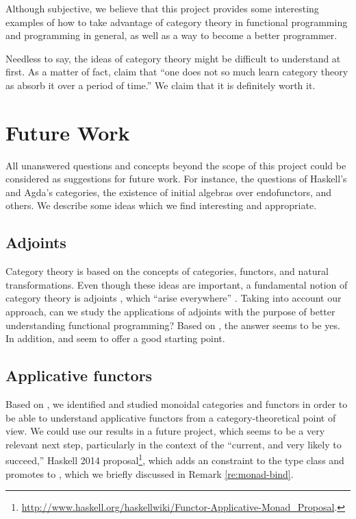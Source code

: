 Although subjective, we believe that this project provides some
interesting examples of how to take advantage of category theory in
functional programming and programming in general, as well as a way to
become a better programmer.

Needless to say, the ideas of category theory might be difficult to
understand at first. As a matter of fact,
\textcite[25]{bird-demoor-1997} claim that ``one does not so much
learn category theory as absorb it over a period of time.'' We claim
that it is definitely worth it.

\section{Future Work}
\label{sec:future}

All unanswered questions and concepts beyond the scope of this project
could be considered as suggestions for future work. For instance, the
questions of Haskell's and Agda's categories, the existence of initial
algebras over endofunctors, and others. We describe some ideas which
we find interesting and appropriate.

\subsection{Adjoints}
\label{sec:future-adjoints}

Category theory is based on the concepts of categories, functors, and
natural transformations. Even though these ideas are important, a
fundamental notion of category theory is adjoints
\parencite[11]{marquis-2013}, which ``arise everywhere''
\parencite[vii]{maclane-1998}. Taking into account our approach, can
we study the applications of adjoints with the purpose of better
understanding functional programming? Based on \parencites[§
  13]{barr-wells-2012}[79--81]{elkins-2009}[§~2.4]{pierce-1991}{rydeheard-1986-adjunctions}[§
  6]{rydeheard-burstall-1988}, the answer seems to be yes. In
addition, \textcite[§ 9]{awodey-2010} and
\textcite[§~IV]{maclane-1998} seem to offer a good starting point.

\subsection{Applicative functors}
\label{sec:future-monoidals}

Based on \parencite{mcbride-paterson-2008}, we identified and studied
monoidal categories and functors in order to be able to understand
applicative functors from a category-theoretical point of view. We
could use our results in a future project, which seems to be a very
relevant next step, particularly in the context of the ``current, and
very likely to succeed,'' Haskell 2014 
proposal\footnote{\url{http://www.haskell.org/haskellwiki/Functor-Applicative-Monad_Proposal}.},
which adds an  constraint to the
 type class and promotes  to
, which we briefly discussed in Remark
\ref{re:monad-bind}.

